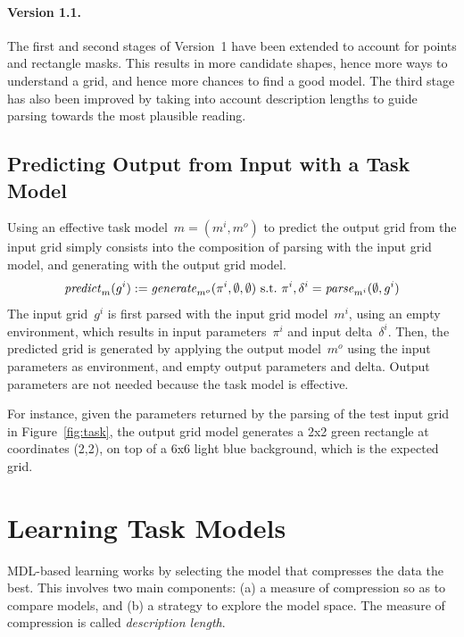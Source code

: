 \documentclass[a4paper]{llncs}
\begin{document}
\paragraph{Version 1.1.} The first and second stages of Version~1 have
been extended to account for points and rectangle masks. This results
in more candidate shapes, hence more ways to understand a grid, and
hence more chances to find a good model. The third stage has also been
improved by taking into account description lengths to guide parsing
towards the most plausible reading.


\subsection{Predicting Output from Input with a Task Model}
\label{predicting}


Using an effective task model~$m = (m^i,m^o)$ to predict the output
grid from the input grid simply consists into the composition of
parsing with the input grid model, and generating with the output grid
model.
\[ {\it predict}_m(g^i) := {\it
    generate}_{m^o}(\pi^i,\emptyset,\emptyset) \textrm{~s.t.~} \pi^i,
  \delta^i = {\it parse}_{m^i}(\emptyset, g^i) \] 
%
The input grid~$g^i$ is first parsed with the input grid model~$m^i$,
using an empty environment, which results in input parameters~$\pi^i$
and input delta~$\delta^i$. Then, the predicted grid is generated by
applying the output model~$m^o$ using the input parameters as
environment, and empty output parameters and delta. Output parameters
are not needed because the task model is effective.

For instance, given the parameters returned by the parsing of the test
input grid in Figure~\ref{fig:task}, the output grid model generates a
2x2 green rectangle at coordinates (2,2), on top of a 6x6 light blue
background, which is the expected grid.

\section{Learning Task Models}
\label{learning}

MDL-based learning works by selecting the model that compresses the
data the best. This involves two main components: (a) a measure of
compression so as to compare models, and (b) a strategy to explore the
model space. The measure of compression is called {\em description
  length}.
\end{document}
